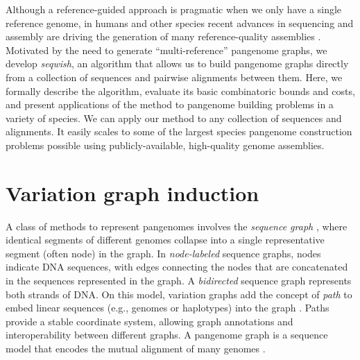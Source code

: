 \documentclass{bioinfo}
\theoremstyle{definition}
\begin{document}
Although a reference-guided approach is pragmatic when we only have a single reference genome, in humans and other species recent advances in sequencing and assembly are driving the generation of many reference-quality assemblies \cite{Nurk_2021}.
Motivated by the need to generate ``multi-reference'' pangenome graphs, we develop \textit{seqwish}, an algorithm that allows us to build pangenome graphs directly from a collection of sequences and pairwise alignments between them.
Here, we formally describe the algorithm, evaluate its basic combinatoric bounds and costs, and present applications of the method to pangenome building problems in a variety of species.
We can apply our method to any collection of sequences and alignments.
It easily scales to some of the largest species pangenome construction problems possible using publicly-available, high-quality genome assemblies.



\section{Variation graph induction}
\label{sec:algorithm}

A class of methods to represent pangenomes involves the \textit{sequence graph} \citep{Hein_1989}, where identical segments of different genomes collapse into a single representative segment (often node) in the graph.
In \textit{node-labeled} sequence graphs, nodes indicate DNA sequences, with edges connecting the nodes that are concatenated in the sequences represented in the graph.
A \textit{bidirected} sequence graph represents both strands of DNA.
On this model, variation graphs add the concept of \textit{path} to embed linear sequences (e.g., genomes or haplotypes) into the graph \citep{Garrison_2018}.
Paths provide a stable coordinate system, allowing graph annotations and interoperability between different graphs.
A pangenome graph is a sequence model that encodes the mutual alignment of many genomes \citep{Eizenga_2020}.
\end{document}
